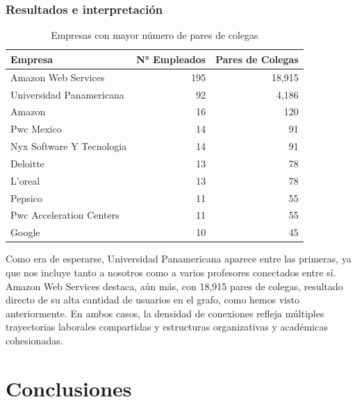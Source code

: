 \documentclass[10pt]{article}
\begin{document}
\subsubsection*{Resultados e interpretación}
\begin{table}[H]
	\centering
	\begin{tabular}{|l|r|r|}
		\hline
		\textbf{Empresa}          & \textbf{N° Empleados} & \textbf{Pares de Colegas} \\
		\hline
		Amazon Web Services       & 195                   & 18,915                    \\
		Universidad Panamericana  & 92                    & 4,186                     \\
		Amazon                    & 16                    & 120                       \\
		Pwc Mexico                & 14                    & 91                        \\
		Nyx Software Y Tecnologia & 14                    & 91                        \\
		Deloitte                  & 13                    & 78                        \\
		L'oreal                   & 13                    & 78                        \\
		Pepsico                   & 11                    & 55                        \\
		Pwc Acceleration Centers  & 11                    & 55                        \\
		Google                    & 10                    & 45                        \\
		\hline
	\end{tabular}
	\caption{Empresas con mayor número de pares de colegas}
\end{table}
Como era de esperarse, Universidad Panamericana aparece entre las primeras, ya que nos incluye tanto a nosotros como a varios profesores conectados entre sí. Amazon Web Services destaca, aún más, con 18,915 pares de colegas, resultado directo de su alta cantidad de usuarios en el grafo, como hemos visto anteriormente. En ambos casos, la densidad de conexiones refleja múltiples trayectorias laborales compartidas y estructuras organizativas y académicas cohesionadas.

\section{Conclusiones}
\end{document}
